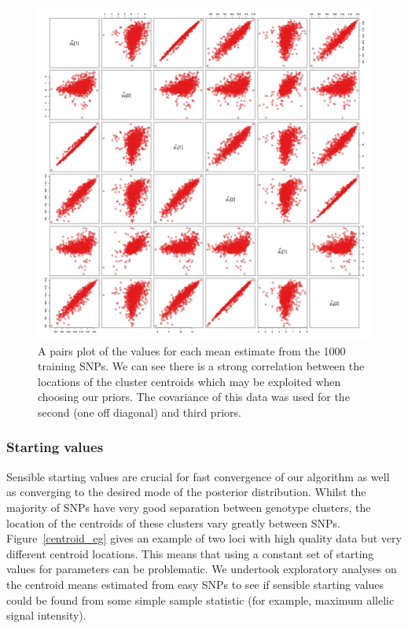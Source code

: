 \begin{figure}
\begin{center} 
\includegraphics[width=\textwidth]{chap2figs/SupFig7}
\caption[Correlations between cluster centroids]{A pairs plot of the values for each mean estimate from the 1000 training SNPs.  We can see there is a strong correlation between the locations of the cluster centroids which may be exploited when choosing our priors.  The covariance of this data was used for the second (one off diagonal) and third priors.\label{mupairs}}
\end{center} 
\end{figure}
\clearpage
\subsubsection{Starting values}
Sensible starting values are crucial for fast convergence of our algorithm as well as converging to the desired mode of the posterior distribution.  Whilst the majority of SNPs have very good separation between genotype clusters, the location of the centroids of these clusters vary greatly between SNPs. Figure~\ref{centroid_eg} gives an example of two loci with high quality data but very different centroid locations. This means that using a constant set of starting values for parameters can be problematic. We undertook exploratory analyses on the centroid means estimated from easy SNPs to see if sensible starting values could be found from some simple sample statistic (for example, maximum allelic signal intensity).

